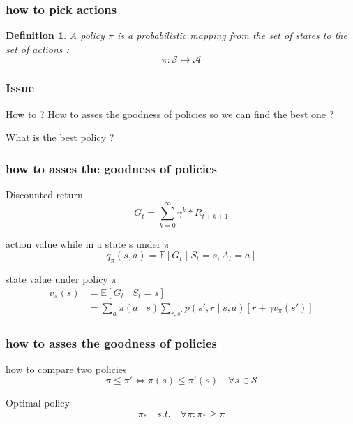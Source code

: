 \documentclass[dvipsnames,svgnames]{beamer}
\newtheorem{madef}{Definition}
\begin{document}
\begin{frame}
\frametitle{how to pick actions}
\begin{madef}
A \emph{policy} $\pi$ is a probabilistic mapping from the set of states to the set of actions : 
$$ \pi : \mathcal{S} \mapsto \mathcal{A} $$

\end{madef}
\end{frame}

\begin{frame}
\frametitle{Issue}
\begin{alertblock}{How to ?}
How to asses the goodness of policies so we can find the best one ? 

What is the best policy ?
\end{alertblock}
\end{frame}

\begin{frame}
\frametitle{how to asses the goodness of policies}
\begin{block}{Discounted return}
$$ G_t= \sum_{k=0}^{\infty}\gamma^k * R_{t+k+1}$$
\end{block}

\pause
\begin{block}{action value while in a state s under $\pi$}
\begin{equation}
q_{\pi}(s,a) = \mathbb{E}[G_t\mid S_t =s,A_t=a]
\end{equation}
\end{block}

\pause
\begin{block}{state value under policy $\pi$}
\begin{equation}
\begin{split}
v_{\pi}(s)&=\mathbb{E}[G_t \mid S_t=s] 
\\& = \sum_{a}\pi(a\mid s)\sum_{r,s'}p(s',r\mid s,a)[r+\gamma v_{\pi}(s')]
\end{split}
\end{equation}
\end{block}



\end{frame}

\begin{frame}
\frametitle{how to asses the goodness of policies}
\begin{block}{how to compare two policies}
$$ \pi \leq \pi ' \iff  \pi (s)\leq \pi ' (s) \quad \forall s \in \mathcal{S}
$$
\end{block}

\pause 

\begin{block}{Optimal policy}
$$ \pi_{*} \quad s.t. \quad \forall \pi : \pi_{*}\geq \pi $$
\end{block}
\end{frame}
\end{document}
